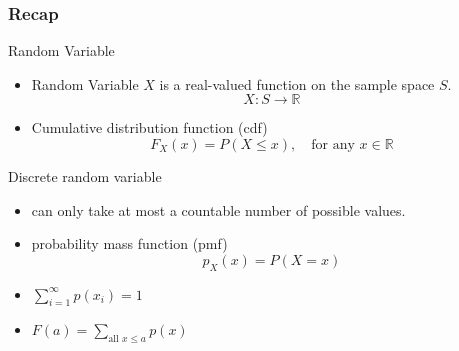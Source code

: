 \documentclass[slidestop,compress,mathserif]{beamer}
\begin{document}
\begin{frame}\frametitle{Recap}

Random Variable
\begin{itemize}
\item Random Variable $X$ is a real-valued  function on the sample space $S$.
\[ X: S \longrightarrow \mathbb{R}\]

\item Cumulative distribution function (cdf)
\[ F_X(x) = P(X \leq x), \quad \text{for any } x \in \mathbb{R} \]
\end{itemize}

Discrete random variable
\begin{itemize}
\item can only take at most a countable number of possible values.
\item probability mass function (pmf)
\[ p_X(x) = P(X = x) \]
\end{itemize}

\vspace{-0.3cm}
{
\begin{itemize}
\item $\sum_{i=1}^{\infty} p(x_i) = 1$
\end{itemize}
}
{
\begin{itemize}
\item $F(a) = \sum_{\text{all } x \leq a} p(x)$
\end{itemize}
}



\end{frame}




\end{document}
